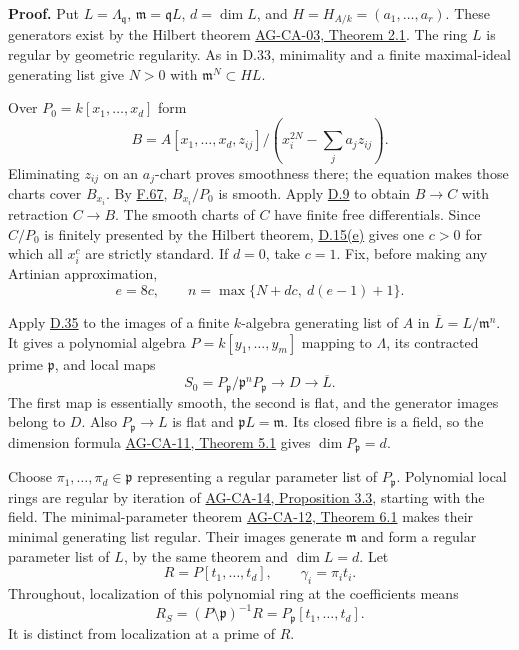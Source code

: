 \documentclass[11pt,a4paper,openany]{report}
\begin{document}
\textbf{Proof.} Put \(L=\Lambda_{\mathfrak q}\), \(\mathfrak m=\mathfrak qL\), \(d=\dim L\), and \(H=H_{A/k}=(a_1,\ldots,a_r)\). These generators exist by the Hilbert theorem \href{https://github.com/KokunoYumeto/open-math-courses/blob/d02d0a3669f42579db037cd44de1d113fdd770a1/docs/courses/AG-CA/src/noetherian-and-artinian-rings.md}{AG-CA-03, Theorem 2.1}. The ring \(L\) is regular by geometric regularity. As in D.33, minimality and a finite maximal-ideal generating list give \(N>0\) with \(\mathfrak m^N\subset HL\).

Over \(P_0=k[x_1,\ldots,x_d]\) form \[
B=A[x_1,\ldots,x_d,z_{ij}]/(x_i^{2N}-\sum_j a_jz_{ij}).
\] Eliminating \(z_{ij}\) on an \(a_j\)-chart proves smoothness there; the equation makes those charts cover \(B_{x_i}\). By \hyperref[AG-RG-S05-algebra-lemma-locally-smooth]{F.67}, \(B_{x_i}/P_0\) is smooth. Apply \hyperref[AG-RG-S05-smoothing-lemma-improve-presentation]{D.9} to obtain \(B\to C\) with retraction \(C\to B\). The smooth charts of \(C\) have finite free differentials. Since \(C/P_0\) is finitely presented by the Hilbert theorem, \hyperref[AG-RG-S05-smoothing-lemma-compare-standard]{D.15(e)} gives one \(c>0\) for which all \(x_i^c\) are strictly standard. If \(d=0\), take \(c=1\). Fix, before making any Artinian approximation, \[
e=8c,\qquad n=\max\{N+dc,\ d(e-1)+1\}.
\tag{D.37a}
\]

Apply \hyperref[AG-RG-S05-smoothing-lemma-solution-modulo]{D.35} to the images of a finite \(k\)-algebra generating list of \(A\) in \(\overline L=L/\mathfrak m^n\). It gives a polynomial algebra \(P=k[y_1,\ldots,y_m]\) mapping to \(\Lambda\), its contracted prime \(\mathfrak p\), and local maps \[
S_0=P_{\mathfrak p}/\mathfrak p^nP_{\mathfrak p}
\longrightarrow D\longrightarrow\overline L.
\] The first map is essentially smooth, the second is flat, and the generator images belong to \(D\). Also \(P_{\mathfrak p}\to L\) is flat and \(\mathfrak pL=\mathfrak m\). Its closed fibre is a field, so the dimension formula \href{https://github.com/KokunoYumeto/open-math-courses/blob/d02d0a3669f42579db037cd44de1d113fdd770a1/docs/courses/AG-CA/src/dimension-theory-of-noetherian-local-rings.md}{AG-CA-11, Theorem 5.1} gives \(\dim P_{\mathfrak p}=d\).

Choose \(\pi_1,\ldots,\pi_d\in\mathfrak p\) representing a regular parameter list of \(P_{\mathfrak p}\). Polynomial local rings are regular by iteration of \href{https://github.com/KokunoYumeto/open-math-courses/blob/d02d0a3669f42579db037cd44de1d113fdd770a1/docs/courses/AG-CA/src/regular-local-rings.md}{AG-CA-14, Proposition 3.3}, starting with the field. The minimal-parameter theorem \href{https://github.com/KokunoYumeto/open-math-courses/blob/d02d0a3669f42579db037cd44de1d113fdd770a1/docs/courses/AG-CA/src/regular-sequences-depth-and-cohen-macaulay-modules.md}{AG-CA-12, Theorem 6.1} makes their minimal generating list regular. Their images generate \(\mathfrak m\) and form a regular parameter list of \(L\), by the same theorem and \(\dim L=d\). Let \[
R=P[t_1,\ldots,t_d],\qquad \gamma_i=\pi_it_i.
\] Throughout, localization of this polynomial ring at the coefficients means \[
R_S=(P\setminus\mathfrak p)^{-1}R=P_{\mathfrak p}[t_1,\ldots,t_d].
\] It is distinct from localization at a prime of \(R\).
\end{document}
